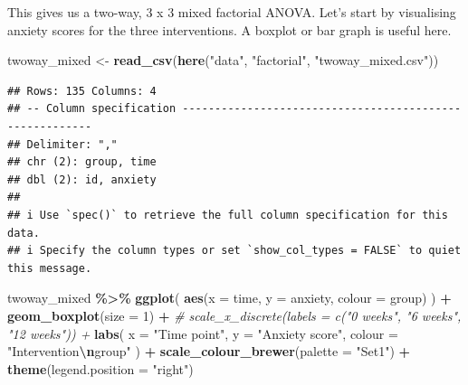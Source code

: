 \documentclass[
]{book}
\newenvironment{Shaded}{\begin{snugshade}}{\end{snugshade}}
\newcommand{\AttributeTok}[1]{\textcolor[rgb]{0.13,0.29,0.53}{#1}}
\newcommand{\CommentTok}[1]{\textcolor[rgb]{0.56,0.35,0.01}{\textit{#1}}}
\newcommand{\DecValTok}[1]{\textcolor[rgb]{0.00,0.00,0.81}{#1}}
\newcommand{\FunctionTok}[1]{\textcolor[rgb]{0.13,0.29,0.53}{\textbf{#1}}}
\newcommand{\NormalTok}[1]{#1}
\newcommand{\OtherTok}[1]{\textcolor[rgb]{0.56,0.35,0.01}{#1}}
\newcommand{\SpecialCharTok}[1]{\textcolor[rgb]{0.81,0.36,0.00}{\textbf{#1}}}
\newcommand{\StringTok}[1]{\textcolor[rgb]{0.31,0.60,0.02}{#1}}
\begin{document}
This gives us a two-way, 3 x 3 mixed factorial ANOVA. Let's start by visualising anxiety scores for the three interventions. A boxplot or bar graph is useful here.

\begin{Shaded}
\begin{Highlighting}[]
\NormalTok{twoway\_mixed }\OtherTok{\textless{}{-}} \FunctionTok{read\_csv}\NormalTok{(}\FunctionTok{here}\NormalTok{(}\StringTok{"data"}\NormalTok{, }\StringTok{"factorial"}\NormalTok{, }\StringTok{"twoway\_mixed.csv"}\NormalTok{))}
\end{Highlighting}
\end{Shaded}

\begin{verbatim}
## Rows: 135 Columns: 4
## -- Column specification --------------------------------------------------------
## Delimiter: ","
## chr (2): group, time
## dbl (2): id, anxiety
## 
## i Use `spec()` to retrieve the full column specification for this data.
## i Specify the column types or set `show_col_types = FALSE` to quiet this message.
\end{verbatim}

\begin{Shaded}
\begin{Highlighting}[]
\NormalTok{twoway\_mixed }\SpecialCharTok{\%\textgreater{}\%}
  \FunctionTok{ggplot}\NormalTok{(}
    \FunctionTok{aes}\NormalTok{(}\AttributeTok{x =}\NormalTok{ time, }\AttributeTok{y =}\NormalTok{ anxiety, }\AttributeTok{colour =}\NormalTok{ group)}
\NormalTok{  ) }\SpecialCharTok{+} 
  \FunctionTok{geom\_boxplot}\NormalTok{(}\AttributeTok{size =} \DecValTok{1}\NormalTok{) }\SpecialCharTok{+}
  \CommentTok{\# scale\_x\_discrete(labels = c("0 weeks", "6 weeks", "12 weeks")) +}
  \FunctionTok{labs}\NormalTok{(}
    \AttributeTok{x =} \StringTok{"Time point"}\NormalTok{,}
    \AttributeTok{y =} \StringTok{"Anxiety score"}\NormalTok{,}
    \AttributeTok{colour =} \StringTok{"Intervention}\SpecialCharTok{\textbackslash{}n}\StringTok{group"}
\NormalTok{  ) }\SpecialCharTok{+}
  \FunctionTok{scale\_colour\_brewer}\NormalTok{(}\AttributeTok{palette =} \StringTok{"Set1"}\NormalTok{) }\SpecialCharTok{+}
  \FunctionTok{theme}\NormalTok{(}\AttributeTok{legend.position =} \StringTok{"right"}\NormalTok{)}
\end{Highlighting}
\end{Shaded}
\end{document}
